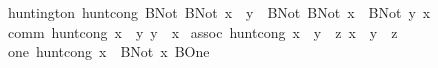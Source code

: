 \begin{isabellebody}
{}\ huntington{}\ {}hunt{}cong\ {}BNot\ {}BNot\ x\ {}{}{}\ y{}\ {}{}{}\ BNot\ {}BNot\ x\ {}{}{}\ BNot\ y{}{}\ x{}\isanewline
{}\ comm{}\ {}hunt{}cong\ {}x\ {}{}{}\ y{}\ {}y\ {}{}{}\ x{}{}\isanewline
{}\ assoc{}\ {}hunt{}cong\ {}{}x\ {}{}{}\ y{}\ {}{}{}\ z{}\ {}x\ {}{}{}\ {}y\ {}{}{}\ z{}{}{}\isanewline
{}\ one{}\ {}hunt{}cong\ {}x\ {}{}{}\ BNot\ x{}\ BOne{}\isanewline

\end{isabellebody}
